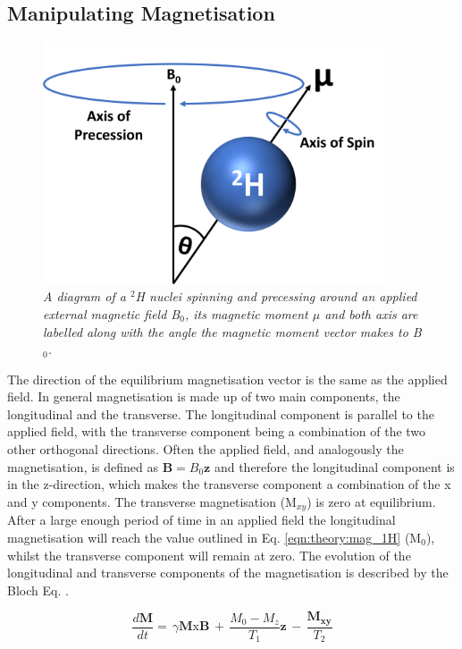 \subsection{Manipulating Magnetisation}

\begin{figure}
    \centering
    \includegraphics[width=0.9\textwidth]{Figures/Theory/Moment.png}
    \caption{\textit{A diagram of a $^2$H nuclei spinning and precessing around an applied external magnetic field B$_0$, its magnetic moment $\mu$ and both axis are labelled along with the angle the magnetic moment vector makes to B$_0$.}}
    \label{fig:theory:moment}
\end{figure}

The direction of the equilibrium magnetisation vector is the same as the applied field. In general magnetisation is made up of two main components, the longitudinal and the transverse. The longitudinal component is parallel to the applied field, with the transverse component being a combination of the two other orthogonal directions. Often the applied field, and analogously the magnetisation, is defined as $\mathbf{B}=B_0\mathbf{z}$ and therefore the longitudinal component is in the z-direction, which makes the transverse component a combination of the x and y components. The transverse magnetisation (M$_{xy}$) is zero at equilibrium. After a large enough period of time in an applied field the longitudinal magnetisation will reach the value outlined in Eq. \ref{eqn:theory:mag_1H} (M$_0$), whilst the transverse component will remain at zero. The evolution of the longitudinal and transverse components of the magnetisation is described by the Bloch Eq. \cite{Bloch1946NuclearInduction}.

\begin{equation}
    \frac{d\mathbf{M}}{dt} = \, \gamma\mathbf{M}\textrm{x}\mathbf{B} \, + \, \frac{M_0-M_z}{T_1}\mathbf{z} \, - \, \frac{\mathbf{M_{xy}}}{T_2}
    \label{eqn:theory:Bloch}
\end{equation}

